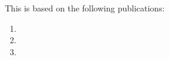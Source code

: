 This \thesis{} is based on the following publications:
\begin{enumerate}
    \item {}
    \item {}
    \item {}
\end{enumerate}
